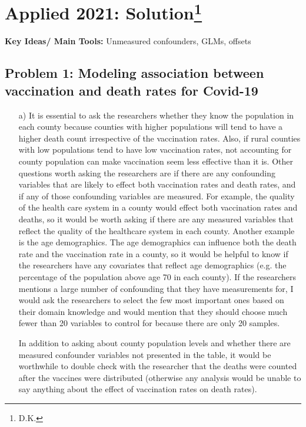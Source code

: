 \section{Applied 2021: Solution\footnote{D.K.}}

\textbf{Key Ideas/ Main Tools:} Unmeasured confounders, GLMs, offsets

\subsection*{Problem 1: Modeling association between vaccination and death rates for Covid-19}

\begin{enumerate}
\item[a)] It is essential to ask the researchers whether they know the population in each county because counties with higher populations will tend to have a higher death count irrespective of the vaccination rates. Also, if rural counties with low populations tend to have low vaccination rates, not accounting for county population can make vaccination seem less effective than it is. \newline Other questions worth asking the researchers are if there are any confounding variables that are likely to effect both vaccination rates and death rates, and if any of those confounding variables are measured. For example, the quality of the health care system in a county would effect both vaccination rates and deaths, so it would be worth asking if there are any measured variables that reflect the quality of the healthcare system in each county. Another example is the age demographics. The age demographics can influence both the death rate and the vaccination rate in a county, so it would be helpful to know if the researchers have any covariates that reflect age demographics (e.g. the percentage of the population above age 70 in each county). If the researchers mentions a large number of confounding that they have measurements for, I would ask the researchers to select the few most important ones based on their domain knowledge and would mention that they should choose much fewer than 20 variables to control for because there are only 20 samples.  \newline

In addition to asking about county population levels and whether there are measured confounder variables not presented in the table, it would be worthwhile to double check with the researcher that the deaths were counted after the vaccines were distributed (otherwise any analysis would be unable to say anything about the effect of vaccination rates on death rates). 



\end{enumerate}
